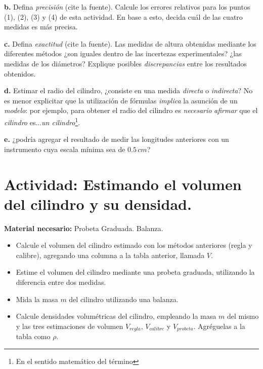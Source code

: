 \documentclass[10pt,a4paper]{article}
\numberwithin{equation}{section}%
\numberwithin{equation}{subsection}
\begin{document}
\noindent \textbf{b.} Defina \textit{precisión} (cite la fuente). Calcule los errores relativos para los puntos (1), (2), (3) y (4) de esta actividad. En base a esto, decida cuál de las cuatro medidas es más precisa.

\noindent \textbf{c.} Defina \textit{exactitud} (cite la fuente). Las medidas de altura obtenidas mediante los diferentes métodos ¿son iguales dentro de las incertezas experimentales? ¿las medidas de los diámetros? Explique posibles \textit{discrepancias} entre los resultados obtenidos.

\noindent \textbf{d.} Estimar el radio del cilindro, ¿consiste en una medida \textit{directa} o \textit{indirecta}? No es menor explicitar que la utilización de fórmulas \textit{implica} la asunción de un \textit{modelo}: por ejemplo, para obtener el radio del cilindro es \textit{necesario} \textit{afirmar} que el \textit{cilindro} es...\textit{un cilindro}\footnote{En el sentido matemático del término}.

\noindent \textbf{e.}  ¿podría agregar el resultado de medir las longitudes anteriores con un instrumento cuya escala mínima sea de $0.5 \, cm$?


\section{Actividad: Estimando el volumen del cilindro y su densidad.}


\textbf{Material necesario:} Probeta Graduada. Balanza. 

\begin{itemize}
\item[1)] Calcule el volumen del cilindro estimado con los métodos anteriores (regla y calibre), agregando una columna a la tabla anterior, llamada $V$.

\item[2)] Estime el volumen del cilindro mediante una probeta graduada, utilizando la diferencia entre dos medidas.

\item[4)] Mida la masa $m$ del cilindro utilizando una balanza.

\item[5)] Calcule densidades volumétricas del cilindro, empleando la masa $m$ del mismo y las tres estimaciones de volumen $V_{regla}$, $V_{calibre}$ y $V_{probeta}$. Agréguelas a la tabla como $\rho$.
\end{itemize}
\end{document}
